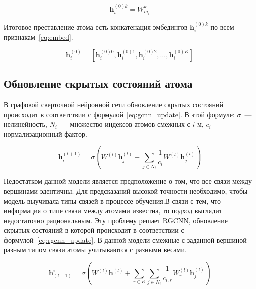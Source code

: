 \documentclass[12pt, twoside]{article}
\begin{document}
\begin{equation}
    \mathbf{h}_{i}^{(0)k} = W^k_{m_i}
    \label{eq:cat_embed}
\end{equation}

Итоговое преставление атома есть конкатенация эмбедингов $\mathbf{h}_{i}^{(0)k}$ по всем признакам~\eqref{eq:embed}.

\begin{equation}
    \mathbf{h}_{i}^{(0)} = [\mathbf{h}_{i}^{(0)0}, \mathbf{h}_{i}^{(0)1}, \mathbf{h}_{i}^{(0)2}, \dots, \mathbf{h}_{i}^{(0)K}]
    \label{eq:embed}
\end{equation}

 
 \subsection{Обновление скрытых состояний атома}
 
 В графовой сверточной нейронной сети обновление скрытых состояний происходит в соответствии с формулой~\eqref{eq:gcnn_update}. В этой формуле: $\sigma$~--- нелинейность, $N_i$~--- множество индексов атомов смежных с $i$-м, $c_i$~--- нормализационный фактор.  

\begin{equation}
    \mathbf{h}^{(l+1)}_i = \sigma \left(W^{(l)}\mathbf{h}^{(l)}_j + \sum \limits_{j \in N_i} \frac{1}{c_i} W^{(l)}\mathbf{h}^{(l)}_j \right) 
    \label{eq:gcnn_update}
\end{equation}

Недостатком данной модели является предположение о том, что все связи между вершинами эдентичны. Для предсказаний высокой точности необходимо, чтобы модель выучивала типы связей в процессе обучения.В связи с тем, что информация о типе связи между атомами известна, то подход выглядит недостаточно рациональным. Эту проблему решает RGCNN, обновление скрытых состояний в которой происходит в соответствии с формулой~\eqref{eq:rgcnn_update}. В данной модели смежные с заданной вершиной разным типом связи атомы учитываются с разными весами.  

\begin{equation}
    \mathbf{h}_{(l+1)}^i = \sigma \left( W^{(l)}\mathbf{h}^{(l)} + \sum \limits_{r \in R}\sum \limits_{j \in N_i} \frac{1}{c_{i, r}} W^{(l)}_r \mathbf{h}^{(l)}_j \right) 
    \label{eq:rgcnn_update}
\end{equation}


{}

\end{document}
